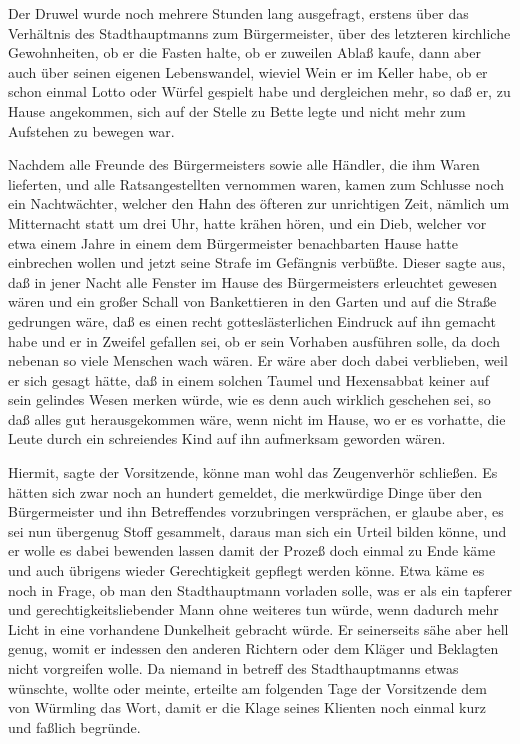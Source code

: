 Der Druwel wurde noch mehrere Stunden lang ausgefragt, erstens über
das Verhältnis des Stadthauptmanns zum Bürgermeister, über des
letzteren kirchliche Gewohnheiten, ob er die Fasten halte, ob er
zuweilen Ablaß kaufe, dann aber auch über seinen eigenen
Lebenswandel, wieviel Wein er im Keller habe, ob er schon einmal
Lotto oder Würfel gespielt habe und dergleichen mehr, so daß er, zu
Hause angekommen, sich auf der Stelle zu Bette legte und nicht mehr
zum Aufstehen zu bewegen war.

Nachdem alle Freunde des Bürgermeisters sowie alle Händler, die ihm
Waren lieferten, und alle Ratsangestellten vernommen waren, kamen
zum Schlusse noch ein Nachtwächter, welcher den Hahn des öfteren
zur unrichtigen Zeit, nämlich um Mitternacht statt um drei Uhr,
hatte krähen hören, und ein Dieb, welcher vor etwa einem Jahre in
einem dem Bürgermeister benachbarten Hause hatte einbrechen wollen
und jetzt seine Strafe im Gefängnis verbüßte. Dieser sagte aus, daß
in jener Nacht alle Fenster im Hause des Bürgermeisters erleuchtet
gewesen wären und ein großer Schall von Bankettieren in den Garten
und auf die Straße gedrungen wäre, daß es einen recht
gotteslästerlichen Eindruck auf ihn gemacht habe und er in Zweifel
gefallen sei, ob er sein Vorhaben ausführen solle, da doch nebenan
so viele Menschen wach wären. Er wäre aber doch dabei verblieben,
weil er sich gesagt hätte, daß in einem solchen Taumel und
Hexensabbat keiner auf sein gelindes Wesen merken würde, wie es
denn auch wirklich geschehen sei, so daß alles gut herausgekommen
wäre, wenn nicht im Hause, wo er es vorhatte, die Leute
\pagenum{[32]} durch ein schreiendes Kind auf ihn aufmerksam
geworden wären.

Hiermit, sagte der Vorsitzende, könne man wohl das Zeugenverhör
schließen. Es hätten sich zwar noch an hundert gemeldet, die
merkwürdige Dinge über den Bürgermeister und ihn Betreffendes
vorzubringen versprächen, er glaube aber, es sei nun übergenug
Stoff gesammelt, daraus man sich ein Urteil bilden könne, und er
wolle es dabei bewenden lassen damit der Prozeß doch einmal zu Ende
käme und auch übrigens wieder Gerechtigkeit gepflegt werden könne.
Etwa käme es noch in Frage, ob man den Stadthauptmann vorladen
solle, was er als ein tapferer und gerechtigkeitsliebender Mann
ohne weiteres tun würde, wenn dadurch mehr Licht in eine vorhandene
Dunkelheit gebracht würde. Er seinerseits sähe aber hell genug,
womit er indessen den anderen Richtern oder dem Kläger und
Beklagten nicht vorgreifen wolle. Da niemand in betreff des
Stadthauptmanns etwas wünschte, wollte oder meinte, erteilte am
folgenden Tage der Vorsitzende dem von Würmling das Wort, damit er
die Klage seines Klienten noch einmal kurz und faßlich begründe.

